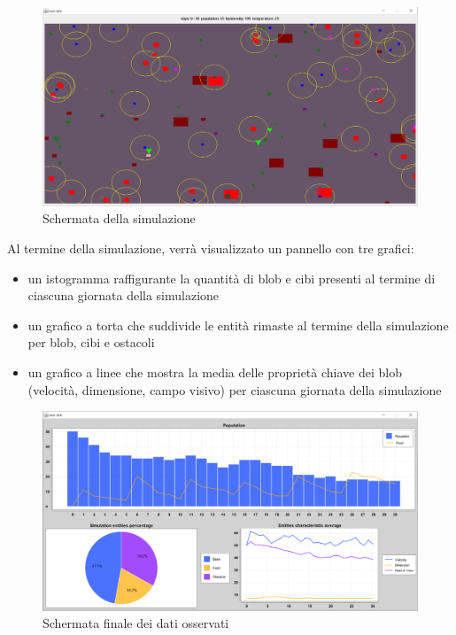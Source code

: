 \begin{figure}[h!]
\centering
\includegraphics[width=\textwidth, scale=0.44]{img/SimulationInterface.png}
\caption{Schermata della simulazione}
\label{fig:SimulationInterface}
\end{figure}

Al termine della simulazione, verrà visualizzato un pannello con tre grafici:
\begin{itemize}
\item un istogramma raffigurante la quantità di blob e cibi presenti al termine di ciascuna giornata della simulazione
\item un grafico a torta che suddivide le entità rimaste al termine della simulazione per blob, cibi e ostacoli
\item un grafico a linee che mostra la media delle proprietà chiave dei blob (velocità, dimensione, campo visivo) per ciascuna giornata della simulazione
\end{itemize}

\begin{figure}[h!]
\centering
\includegraphics[width=\textwidth, scale=0.44]{img/ResultsInterface.png}
\caption{Schermata finale dei dati osservati}
\label{fig:ResultsInterface}
\end{figure}